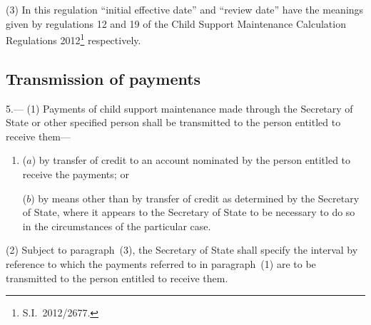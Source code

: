 \documentclass[12pt,a4paper]{article}
\begin{document}
(3) In this regulation “initial effective date” and “review date” have the meanings given by regulations 12 and 19 of the Child Support Maintenance Calculation Regulations 2012\footnote{S.I.~2012/2677.} respectively.


\subsection[5. Transmission of payments]{Transmission of payments}

5.—%
%
%
%
(1) Payments of child support maintenance made through the Secretary of State or other specified person shall be transmitted to the person entitled to receive them---
\begin{enumerate}\item[]
($a$) by transfer of credit to an account nominated by the person entitled to receive the payments; or

($b$) by means other than by transfer of credit as determined by the Secretary of State, where it appears to the Secretary of State to be necessary to do so in the circumstances of the particular case.
\end{enumerate}

(2) 
Subject to paragraph~(3), the Secretary of State  %
shall specify the interval by reference to which the payments referred to in paragraph~(1) are to be transmitted to the person entitled to receive them.

%
%
\end{document}
